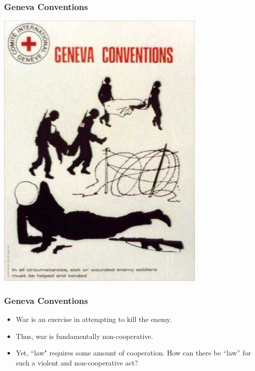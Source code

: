 \documentclass[handout]{beamer}
\begin{document}
\begin{frame} 
	\frametitle{\LARGE{Geneva Conventions}}
	\centering
	\includegraphics[width=\textwidth,height=\textheight,keepaspectratio]{GenevaCon.jpg}
\end{frame}

\begin{frame} 
	\frametitle{\LARGE{Geneva Conventions}}
	\begin{itemize}
		\item War is an exercise in attempting to kill the enemy. 
		\item Thus, war is fundamentally non-cooperative. \pause
		\item Yet, ``law" requires some amount of cooperation. How can there be “law” for such a violent and non-cooperative act?
		
	\end{itemize}
\end{frame}
\end{document}
